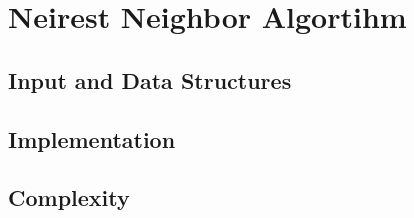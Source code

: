\section{Neirest Neighbor Algortihm}\label{neirest}


\subsection{Input and Data Structures}


\subsection{Implementation}


\subsection{Complexity}


\pagebreak